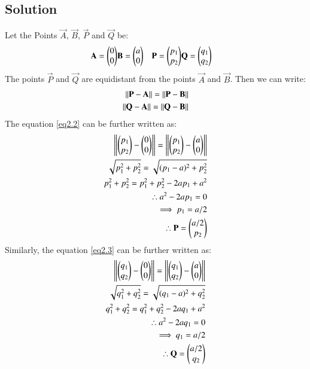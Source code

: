 \documentclass[journal,12pt,twocolumn]{IEEEtran}
\begin{document}
\subsection{Solution}
Let the Points $\vec{A}$, $\vec{B}$, $\vec{P}$ and $\vec{Q}$ be:
\begin{align}
    \mathbf{A}=\begin{pmatrix}0 \\ 0\end{pmatrix} & \mathbf{B}=\begin{pmatrix}a \\ 0\end{pmatrix} & \mathbf{P}=\begin{pmatrix}p_1 \\ p_2\end{pmatrix}&\mathbf{Q}=\begin{pmatrix}q_1 \\ q_2\end{pmatrix}
\end{align}
The points $\vec{P}$ and $\vec{Q}$  are equidistant from the points $\vec{A}$ and $\vec{B}$. Then we can write:
\begin{align}
    \left\lVert\mathbf{P}-\mathbf{A}\right\rVert=\left\lVert\mathbf{P}-\mathbf{B}\right\rVert \label{eq2.2}\\
    \left\lVert\mathbf{Q}-\mathbf{A}\right\rVert=\left\lVert\mathbf{Q}-\mathbf{B}\right\rVert \label{eq2.3}
\end{align}
The equation \ref{eq2.2} can be further written as:
\begin{align}
    \left\lVert\begin{pmatrix}p_1\\p_2\end{pmatrix}-\begin{pmatrix}0\\0\end{pmatrix}\right\rVert=\left\lVert\begin{pmatrix}p_1\\p_2\end{pmatrix}-\begin{pmatrix}a\\0\end{pmatrix}\right\rVert \\
    \sqrt{p_1^2+p_2^2}=  \sqrt{(p_1-a)^2+p_2^2}\\
    p_1^2+p_2^2= p_1^2+p_2^2-2ap_1+a^2\\
    \therefore a^2-2ap_1=0\\
    \implies p_1=a/2\\
    \therefore \mathbf{P}=\begin{pmatrix}a/2 \\ p_2\end{pmatrix}  \label{eq3.9}
\end{align}
Similarly, the equation \ref{eq2.3} can be further written as:
\begin{align}
    \left\lVert\begin{pmatrix}q_1\\q_2\end{pmatrix}-\begin{pmatrix}0\\0\end{pmatrix}\right\rVert=\left\lVert\begin{pmatrix}q_1\\q_2\end{pmatrix}-\begin{pmatrix}a\\0\end{pmatrix}\right\rVert \\
    \sqrt{q_1^2+q_2^2}=  \sqrt{(q_1-a)^2+q_2^2}\\
    q_1^2+q_2^2= q_1^2+q_2^2-2aq_1+a^2 \\
    \therefore a^2-2aq_1=0\\
    \implies q_1=a/2\\
    \therefore \mathbf{Q}=\begin{pmatrix}a/2 \\ q_2\end{pmatrix} \label{eq3.15}
\end{align}
\end{document}

